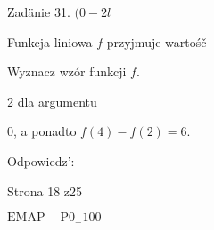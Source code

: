 \documentclass[a4paper,12pt]{article}
\begin{document}
Zadänie 31. $(0-2l$

Funkcja liniowa $f$ przyjmuje wartośč

Wyznacz wzór funkcji $f.$

2 dla argumentu

0, a ponadto $f(4)-f(2)=6.$

Odpowiedz':

Strona 18 z25

$\mathrm{E}\mathrm{M}\mathrm{A}\mathrm{P}-\mathrm{P}0_{-}100$
\end{document}
